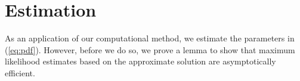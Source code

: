 \documentclass[10pt]{article}
\begin{document}


\section{Estimation}
As an application of our computational method, we estimate the
parameters in (\ref{eq:pdf}). However, before we do so, we prove a
lemma to show that maximum likelihood estimates based on the
approximate solution are asymptotically efficient.
\end{document}
